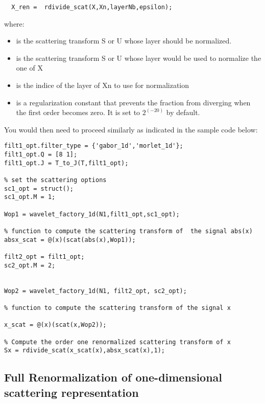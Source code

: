 \documentclass{article}
\begin{document}
\begin{lstlisting}
  X_ren =  rdivide_scat(X,Xn,layerNb,epsilon);
\end{lstlisting}

where:

\begin{itemize}

    \item {} is the scattering transform S or U whose layer should be normalized.
	\item {} is the scattering transform S or U whose layer would be used to normalize the one of X
	\item {} is the indice of the layer of Xn to use for normalization
    \item {}  is a regularization constant that prevents the fraction from diverging when the first order becomes zero. It is set to $2^(-20)$ by default.

\end{itemize}

You would then need to proceed similarly as indicated in the sample code below:

\begin{lstlisting}
filt1_opt.filter_type = {'gabor_1d','morlet_1d'};
filt1_opt.Q = [8 1];
filt1_opt.J = T_to_J(T,filt1_opt);

% set the scattering options
sc1_opt = struct();
sc1_opt.M = 1;

Wop1 = wavelet_factory_1d(N1,filt1_opt,sc1_opt);

% function to compute the scattering transform of  the signal abs(x)
absx_scat = @(x)(scat(abs(x),Wop1));

filt2_opt = filt1_opt;
sc2_opt.M = 2;


Wop2 = wavelet_factory_1d(N1, filt2_opt, sc2_opt);

% function to compute the scattering transform of the signal x

x_scat = @(x)(scat(x,Wop2));

% Compute the order one renormalized scattering transform of x
Sx = rdivide_scat(x_scat(x),absx_scat(x),1);

\end{lstlisting}


\subsection{Full Renormalization of one-dimensional scattering representation}
\end{document}
